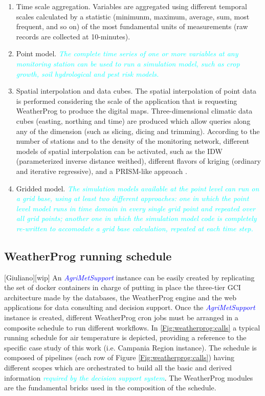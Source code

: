 \documentclass[authoryear,preprint,review,12pt]{elsarticle}
\newcommand{\update}[1]{\emph{\textcolor{blue}{#1}}}
\newcommand{\review}[1]{\emph{\textcolor{cyan}{#1}}}
\newcommand{\gci}{\update{AgriMetSupport}\xspace}
\begin{document}
\begin{enumerate}
    \item Time scale aggregation. Variables are aggregated using different temporal scales calculated by a statistic (minimunm, maximum, average, sum, most frequent, and so on) of the most fundamental units of measurements (raw records are collected at 10-minutes).
    
    \item Point model. \review{  The complete time series of one or more variables at any monitoring station can be used to run a simulation model, such as crop growth, soil hydrological and pest risk models. }
    
    \item Spatial interpolation and data cubes. The spatial interpolation of point data is performed considering the scale of the application that is requesting WeatherProg to produce the digital maps.
    Three-dimensional climatic data cubes (easting, northing and time) are produced which allow queries along any of the dimension (such as slicing, dicing and trimming). According to the number of stations and to the density of the monitoring network, different models of spatial interpolation can be activated, such as the IDW (parameterized inverse distance weithed), different flavors of kriging (ordinary and iterative regressive), and a PRISM-like approach \citep{Daly08_PRISM_USA}.
    
    \item Gridded model. \review{ The simulation models available at the point level can run on a grid base, using at least two different approaches: one in which the point level model runs in time domain in every single grid point and repeated over all grid points; another one in which the simulation model code is completely re-written to accomodate a grid base calculation, repeated at each time step. }
    
\end{enumerate}

\subsection{ WeatherProg running schedule }[Giuliano][wip]
An \gci instance can be easily created by replicating the set of docker containers in charge of putting in place the three-tier GCI architecture made by the databases, the WeatherProg engine and the web applications for data consulting and decision support.
Once the \gci instance is created, different WeatherProg cron jobs must be arranged in a composite schedule to run %
different workflows.
In \cref{Fig:weatherprog:calls} a typical running schedule for air temperature is depicted, providing a reference to the specific case study of this work (i.e. Campania Region instance).
The schedule is composed of pipelines (each row of Figure \ref{Fig:weatherprog:calls}) having different scopes which are orchestrated to build all the basic and derived information \review{required by the decision support system}.
The WeatherProg modules are the fundamental bricks used in the composition of the schedule.
\end{document}
